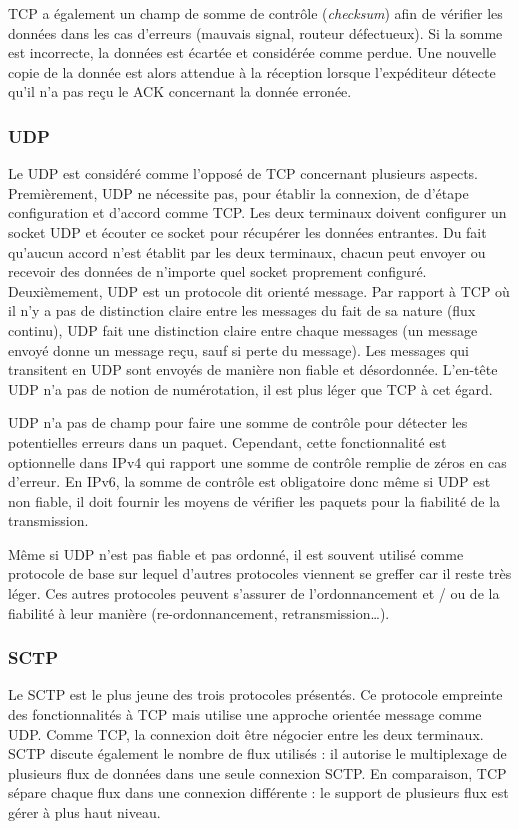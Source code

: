 \gls{TCP} a également un champ de somme de contrôle (\textit{checksum}) afin 
de vérifier les données dans les cas d'erreurs (mauvais signal, routeur 
défectueux). 
Si la somme est incorrecte, la données est écartée et considérée comme perdue. 
Une nouvelle copie de la donnée est alors attendue à la réception lorsque 
l'expéditeur détecte qu'il n'a pas reçu le ACK concernant la donnée erronée.

\subsubsection{UDP}
Le \gls{UDP} est considéré comme l'opposé de \gls{TCP} concernant plusieurs 
aspects. Premièrement, \gls{UDP} ne nécessite pas, pour établir la connexion, de 
d'étape configuration et d'accord comme \gls{TCP}. Les deux terminaux doivent 
configurer un socket \gls{UDP} et écouter ce socket pour récupérer les données 
entrantes. Du fait qu'aucun accord n'est établit par les deux terminaux, chacun 
peut envoyer ou recevoir des données de n'importe quel socket proprement 
configuré.
Deuxièmement, \gls{UDP} est un protocole dit \og orienté message\fg{}. Par 
rapport à \gls{TCP} où il n'y a pas de distinction claire entre les messages du fait 
de sa nature (flux continu), \gls{UDP} fait une distinction claire entre chaque 
messages (un message envoyé donne un message reçu, sauf si perte du 
message). Les messages qui transitent en \gls{UDP} sont envoyés de manière 
non fiable et désordonnée. L'en-tête \gls{UDP} n'a pas de notion de numérotation, il 
est plus léger que \gls{TCP} à cet égard.

\gls{UDP} n'a pas de champ pour faire une somme de contrôle pour détecter les 
potentielles erreurs dans un paquet. Cependant, cette fonctionnalité est optionnelle 
dans IPv4 qui rapport une somme de contrôle remplie de zéros en cas d'erreur. En 
IPv6, la somme de contrôle est obligatoire donc même si \gls{UDP} est non fiable, 
il doit fournir les moyens de vérifier les paquets pour la fiabilité de 
la transmission.

Même si \gls{UDP} n'est pas fiable et pas ordonné, il est souvent utilisé comme 
protocole de base sur lequel d'autres protocoles viennent se greffer car il reste très 
léger. Ces autres protocoles peuvent s'assurer de l'ordonnancement et / ou de la 
fiabilité à leur manière (re-ordonnancement, retransmission\dots). 

\subsubsection{SCTP}
Le \gls{SCTP} est le plus jeune des trois protocoles présentés. Ce protocole 
empreinte des fonctionnalités à \gls{TCP} mais utilise une approche orientée 
message comme \gls{UDP}. Comme \gls{TCP}, la connexion doit être négocier 
entre les deux terminaux. \gls{SCTP} discute également le nombre de flux utilisés 
: il autorise le multiplexage de plusieurs flux de données dans une seule 
connexion \gls{SCTP}. En comparaison, \gls{TCP} sépare chaque flux dans une 
connexion différente : le support de plusieurs flux est gérer à plus haut niveau.

